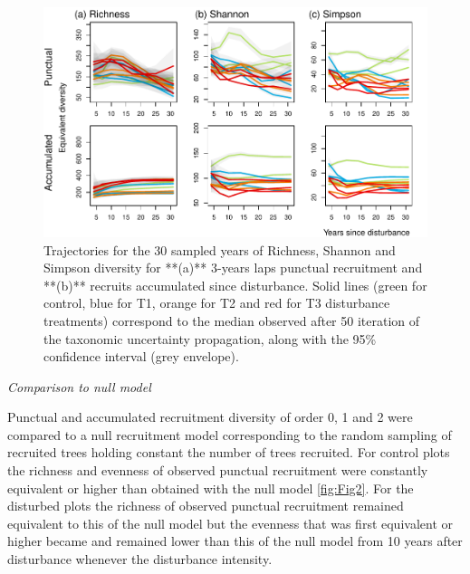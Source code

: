 \documentclass[fleqn,10pt]{ArtEcoFoG} %
\begin{document}
\begin{figure}

{\centering \includegraphics[width=0.8\linewidth]{RecruitmentTrajectories_files/figure-latex/Fig1-1} 

}

\caption{Trajectories for the 30 sampled years of Richness, Shannon and Simpson diversity for **(a)**  3-years laps punctual recruitment and **(b)** recruits accumulated since disturbance. Solid lines (green for control, blue for T1, orange for T2 and red for T3 disturbance treatments) correspond to the median observed after 50 iteration of the taxonomic uncertainty propagation, along with the 95\% confidence interval (grey envelope).}\label{fig:Fig1}
\end{figure}

\emph{Comparison to null model}

Punctual and accumulated recruitment diversity of order 0, 1 and 2 were
compared to a null recruitment model corresponding to the random
sampling of recruited trees holding constant the number of trees
recruited. For control plots the richness and evenness of observed
punctual recruitment were constantly equivalent or higher than obtained
with the null model \ref{fig:Fig2}. For the disturbed plots the richness
of observed punctual recruitment remained equivalent to this of the null
model but the evenness that was first equivalent or higher became and
remained lower than this of the null model from 10 years after
disturbance whenever the disturbance intensity.
\end{document}
